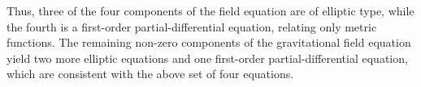 \documentclass[12pt]{article}
\def\be{\begin{equation}}
\def\ee{\end{equation}}
\begin{document}
Thus, three of the four components of the field equation are
of elliptic type, while the fourth is a first-order
partial-differential
equation, relating only metric functions. The remaining non-zero
components of the gravitational field equation yield two more
elliptic equations and one first-order partial-differential equation,
which are consistent with the above set of four equations. 

%
%
\end{document}
